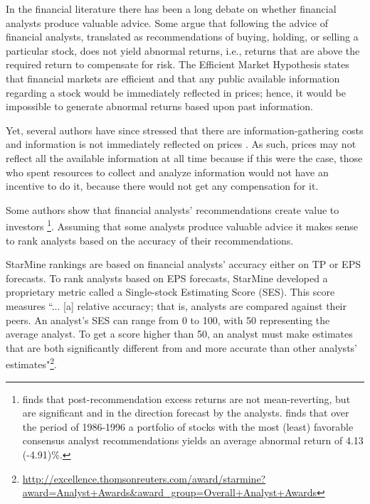 \documentclass{article}\usepackage[]{graphicx}\usepackage[]{color}
\begin{document}
In the financial literature there has been a long debate on whether financial analysts produce valuable  advice. Some argue that following the advice of financial analysts,  translated as recommendations of buying, holding, or selling a particular stock, does not yield  abnormal returns, i.e.,  returns that are above the required return to compensate for risk. The Efficient Market Hypothesis \citep{fama1970ecm} states that financial markets are efficient and that any public available information  regarding a stock would be immediately reflected in prices; hence, it would be  impossible to generate abnormal returns based upon past information.

Yet, several authors have since stressed that  there are information-gathering costs and information is not immediately reflected on prices  \citep{grossman1980iie}. As such, prices may not  reflect all the available information at all time because if this were the case, those who spent resources to collect and analyze   information would not have an incentive to do it, because there would not get any compensation for it.



Some authors show that financial analysts' recommendations create value to investors \citep{womack1996,barber2001}\footnote{\cite{womack1996} finds that  post-recommendation excess returns are not mean-reverting, but are significant and in the direction forecast by the analysts. \cite{barber2001} finds that over the period of 1986-1996 a portfolio of stocks with the most (least) favorable consensus analyst recommendations yields an average abnormal return of 4.13 (-4.91)\%.}. Assuming that some analysts produce valuable advice it makes sense to rank analysts based on the accuracy of their recommendations. 

StarMine rankings are based on financial analysts' accuracy either on TP or EPS forecasts. To rank analysts based on EPS forecasts, StarMine developed a proprietary metric called a Single-stock Estimating Score (SES). This score measures ``... [a] relative accuracy; that is, analysts are compared against their peers. An analyst's SES can range from 0 to 100, with 50 representing the average analyst. To get a score higher than 50, an analyst must make estimates that are both significantly different from and more accurate than other analysts' estimates"\footnote{\url{http://excellence.thomsonreuters.com/award/starmine?award=Analyst+Awards&award_group=Overall+Analyst+Awards}}.
\end{document}
